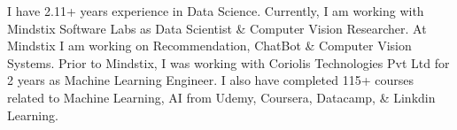 
\begin{cvparagraph}
I have 2.11+ years experience in Data Science. Currently, I am working with Mindstix Software Labs as Data Scientist \& Computer Vision Researcher. 
At Mindstix I am working on Recommendation, ChatBot \& Computer Vision Systems.
\newline Prior to Mindstix, I was working with Coriolis Technologies Pvt Ltd for 2 years as Machine Learning Engineer.
\newline I also have completed 115+ courses related to Machine Learning, AI from Udemy, Coursera, Datacamp, \& Linkdin Learning.

\end{cvparagraph}
